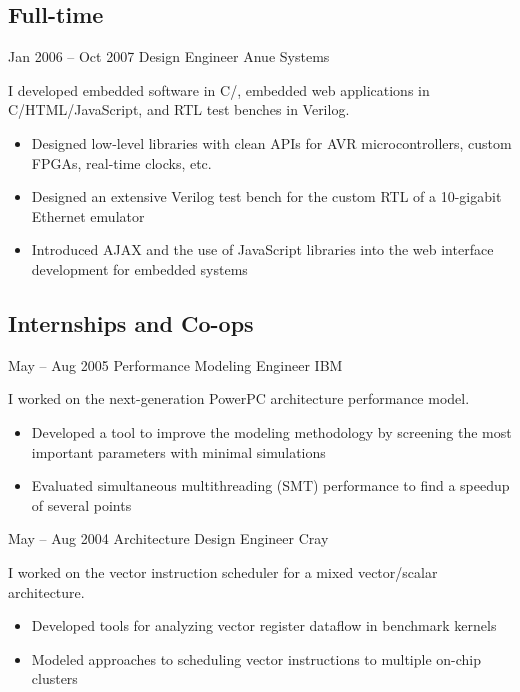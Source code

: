 \documentclass[11pt,a4paper,roman]{moderncv}
\begin{document}

\subsection{Full-time}

\cventry%
{Jan 2006 -- Oct 2007}%
{Design Engineer}%
{Anue Systems}%
{\austin}%
{}%
{I developed embedded software in C/\Cpp, embedded web applications in C/HTML/JavaScript, and RTL test benches in Verilog.
\begin{itemize}
\item Designed low-level libraries with clean APIs for AVR microcontrollers, custom FPGAs, real-time clocks, etc.
\item Designed an extensive Verilog test bench for the custom RTL of a 10-gigabit Ethernet emulator
\item Introduced AJAX and the use of JavaScript libraries into the web interface development for embedded systems
\end{itemize}}


\subsection{Internships and Co-ops}

\cventry%
{May -- Aug 2005}%
{Performance Modeling Engineer}%
{IBM}%
{\austin}%
{}%
{I worked on the next-generation PowerPC architecture performance model.
\begin{itemize}
\item Developed a tool to improve the modeling methodology by screening the most important parameters with minimal simulations
\item Evaluated simultaneous multithreading (SMT) performance to find a speedup of several points
\end{itemize}}

\cventry%
{May -- Aug 2004}%
{Architecture Design Engineer}%
{Cray}%
{\chippewafalls}%
{}%
{I worked on the vector instruction scheduler for a mixed vector/scalar architecture.
\begin{itemize}
\item Developed tools for analyzing vector register dataflow in benchmark kernels
\item Modeled approaches to scheduling vector instructions to multiple on-chip clusters
\end{itemize}}
\end{document}

